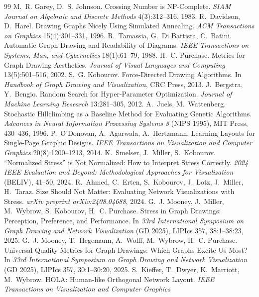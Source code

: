 \documentclass[a4paper,UKenglish]{gd-lipics-v3}
\begin{document}
\begin{thebibliography}{99}
 M.~R. Garey, D.~S. Johnson. Crossing Number is NP-Complete. \emph{SIAM
 Journal on Algebraic and Discrete Methods} 4(3):312--316, 1983.
 R.~Davidson, D.~Harel. Drawing Graphs Nicely Using Simulated Annealing.
 \emph{ACM Transactions on Graphics} 15(4):301--331, 1996.
 R.~Tamassia, G.~Di Battista, C.~Batini. Automatic Graph Drawing and
 Readability of Diagrams. \emph{IEEE Transactions on Systems, Man, and Cybernetics}
 18(1):61--79, 1988.
 H.~C. Purchase. Metrics for Graph Drawing Aesthetics. \emph{Journal
 of Visual Languages and Computing} 13(5):501--516, 2002.
 S.~G. Kobourov. Force-Directed Drawing Algorithms. In \emph{Handbook
 of Graph Drawing and Visualization}, CRC Press, 2013.
 J.~Bergstra, Y.~Bengio. Random Search for Hyper-Parameter
 Optimization. \emph{Journal of Machine Learning Research} 13:281--305, 2012.
 A.~Juels, M.~Wattenberg. Stochastic Hillclimbing as a Baseline Method for
 Evaluating Genetic Algorithms. \emph{Advances in Neural Information Processing Systems 8}
 (NIPS 1995), MIT Press, 430--436, 1996.
 P.~O'Donovan, A.~Agarwala, A.~Hertzmann. Learning Layouts for
 Single-Page Graphic Designs. \emph{IEEE Transactions on Visualization and Computer
 Graphics} 20(8):1200--1213, 2014.
 K.~Smelser, J.~Miller, S.~Kobourov. ``Normalized Stress'' is Not
 Normalized: How to Interpret Stress Correctly. \emph{2024 IEEE Evaluation and Beyond:
 Methodological Approaches for Visualization} (BELIV), 41--50, 2024.
 R.~Ahmed, C.~Erten, S.~Kobourov, J.~Lotz, J.~Miller, H.~Taraz. Size
 Should Not Matter: Evaluating Network Visualizations with Stress. \emph{arXiv preprint
 arXiv:2408.04688}, 2024.
 G.~J. Mooney, J.~Miller, M.~Wybrow, S.~Kobourov, H.~C. Purchase.
 Stress in Graph Drawings: Perception, Preference, and Performance. In \emph{33rd
 International Symposium on Graph Drawing and Network Visualization} (GD 2025), LIPIcs 357,
 38:1--38:23, 2025.
 G.~J. Mooney, T.~Hegemann, A.~Wolff, M.~Wybrow, H.~C. Purchase.
 Universal Quality Metrics for Graph Drawings: Which Graphs Excite Us Most? In \emph{33rd
 International Symposium on Graph Drawing and Network Visualization} (GD 2025), LIPIcs 357,
 30:1--30:20, 2025.
 S.~Kieffer, T.~Dwyer, K.~Marriott, M.~Wybrow. HOLA: Human-like Orthogonal
 Network Layout. \emph{IEEE Transactions on Visualization and Computer Graphics}

\end{thebibliography}
\end{document}
